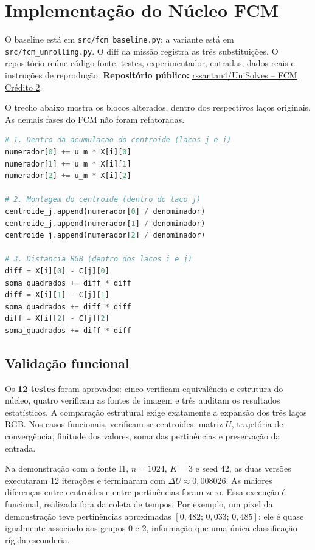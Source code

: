 \documentclass[11pt,a4paper]{article}
\begin{document}
\section{Implementação do Núcleo FCM}
O baseline está em \texttt{src/fcm\_baseline.py}; a variante está em
\texttt{src/fcm\_unrolling.py}. O diff da missão registra as três substituições.
O repositório reúne código-fonte, testes, experimentador, entradas, dados reais
e instruções de reprodução. \textbf{Repositório público:} \href{https://github.com/rssantan4/UniSolves/tree/main/EngenariadeProgramas/FCM_Credito2_Missao4}{rssantan4/UniSolves -- FCM Crédito 2}.

O trecho abaixo mostra os blocos alterados, dentro dos respectivos laços
originais. As demais fases do FCM não foram refatoradas.

\noindent\begin{minipage}{\linewidth}
\begin{lstlisting}[language=Python,caption={Operações RGB explícitas na variante.}]
# 1. Dentro da acumulacao do centroide (lacos j e i)
numerador[0] += u_m * X[i][0]
numerador[1] += u_m * X[i][1]
numerador[2] += u_m * X[i][2]

# 2. Montagem do centroide (dentro do laco j)
centroide_j.append(numerador[0] / denominador)
centroide_j.append(numerador[1] / denominador)
centroide_j.append(numerador[2] / denominador)

# 3. Distancia RGB (dentro dos lacos i e j)
diff = X[i][0] - C[j][0]
soma_quadrados += diff * diff
diff = X[i][1] - C[j][1]
soma_quadrados += diff * diff
diff = X[i][2] - C[j][2]
soma_quadrados += diff * diff
\end{lstlisting}
\end{minipage}

\subsection{Validação funcional}
Os \textbf{12 testes} foram aprovados: cinco verificam equivalência e estrutura
do núcleo, quatro verificam as fontes de imagem e três auditam os resultados
estatísticos. A comparação estrutural exige exatamente a expansão dos três
laços RGB. Nos casos funcionais, verificam-se centroides, matriz $U$,
trajetória de convergência, finitude dos valores, soma das pertinências e
preservação da entrada.

Na demonstração com a fonte I1, $n=1024$, $K=3$ e seed 42, as duas versões
executaram 12 iterações e terminaram com $\Delta U\approx0{,}008026$.
As maiores diferenças entre centroides e entre pertinências foram zero.
Essa execução é funcional, realizada fora da coleta de tempos.
Por exemplo, um pixel da demonstração teve pertinências aproximadas
$[0{,}482;\,0{,}033;\,0{,}485]$: ele é quase igualmente associado aos grupos
0 e 2, informação que uma única classificação rígida esconderia.
\end{document}
